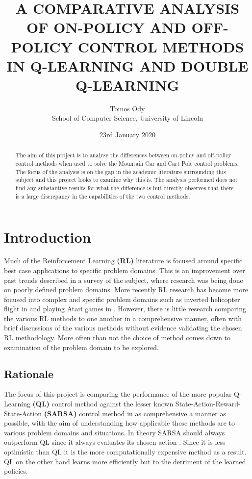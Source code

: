 \documentclass[hidelinks,journal]{IEEEtran}
\title{A COMPARATIVE ANALYSIS OF ON-POLICY AND OFF-POLICY CONTROL METHODS IN Q-LEARNING AND DOUBLE Q-LEARNING\\}
\author{Tomos Ody\\School of Computer Science, University of Lincoln}
\date{23rd January 2020}
\begin{document}
\maketitle

\begin{abstract}
  The aim of this project is to analyse the differences between on-policy and off-policy control methods when used to solve the Mountain Car and Cart Pole control problems. The focus of the analysis is on the gap in the academic literature surrounding this subject and this project looks to examine why this is. The analysis performed does not find any substantive results for what the difference is but directly observes that there is a large discrepancy in the capabilities of the two control methods.
\end{abstract}

\section{Introduction}
\label{sec:introduction}
Much of the Reinforcement Learning \textbf{(RL)} literature is focused around specific best case applications to specific problem domains. This is an improvement over past trends described in \textcite{Kaelbling96} a survey of the subject, where research was being done on poorly defined problem domains. More recently RL research has become more focused into complex and specific problem domains such as inverted helicopter flight in \textcite{Ng06} and playing Atari games in \textcite{Mnih13}. However, there is little research comparing the various RL methods to one another in a comprehensive manner, often with brief discussions of the various methods without evidence validating the chosen RL methodology. More often than not the choice of method comes down to examination of the problem domain to be explored.

\subsection{Rationale}
\label{subsec:intRationale}
The focus of this project is comparing the performance of the more popular Q-Learning \textbf{(QL)}  control method \parencite{Watkins92} against the lesser known State-Action-Reward-State-Action \textbf{(SARSA)} control method \parencite{Rummery94} in as comprehensive a manner as possible, with the aim of understanding how applicable these methods are to various problem domains and situations. In theory SARSA should always outperform QL since it always evaluates its chosen action \parencite{Sutton18}. Since it is less optimistic than QL it is the more computationally expensive method as a result. QL on the other hand learns more efficiently but to the detriment of the learned policies.
\end{document}
